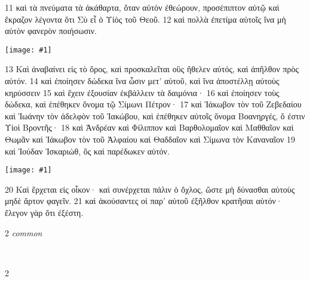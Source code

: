 \documentclass[10pt,a5paper,twoside,twocolumn]{book}
\newcommand{\fig}[1]{\texttt{[image: \#1]}\label{fig:#1}}
\newcommand*\cleartoleftpage{%
  \ifodd\value{page}\hbox{}\clearpage\fi
}
\newcommand{\separator}{\hspace{0.27\textwidth}\noindent\makebox[\linewidth]{\resizebox{0.3333\linewidth}{1pt}{$\bullet$}}\bigskip}
\newenvironment{facing}{\cleartoleftpage}{\clearpage\pagebreak}
\newenvironment{help}{\clearpage}{}
\newenvironment{helpsec}{\begin{minipage}[t]{\textwidth}\begin{multicols}{2}}{\end{multicols}\end{minipage}}
\newenvironment{vocab}{\begin{helpsec}}{\end{helpsec}}
\newenvironment{translation}{\separator\\\begin{helpsec}\footnotesize}{\end{helpsec}}
\begin{document}
\begin{facing}

11 καὶ τὰ πνεύματα τὰ ἀκάθαρτα, ὅταν αὐτὸν ἐθεώρουν, προσέπιπτον αὐτῷ καὶ ἔκραζον λέγοντα ὅτι Σὺ εἶ ὁ Υἱὸς τοῦ Θεοῦ. 12 καὶ πολλὰ ἐπετίμα αὐτοῖς ἵνα μὴ αὐτὸν φανερὸν ποιήσωσιν. 

\fig{03-13} %

13 Καὶ ἀναβαίνει εἰς τὸ ὄρος, καὶ προσκαλεῖται οὓς ἤθελεν αὐτός, καὶ ἀπῆλθον πρὸς αὐτόν. 14 καὶ ἐποίησεν δώδεκα ἵνα ὦσιν μετ’ αὐτοῦ, καὶ ἵνα ἀποστέλλῃ αὐτοὺς κηρύσσειν 15 καὶ ἔχειν ἐξουσίαν ἐκβάλλειν τὰ δαιμόνια· 16 καὶ ἐποίησεν τοὺς δώδεκα, καὶ ἐπέθηκεν ὄνομα τῷ Σίμωνι Πέτρον· 17 καὶ Ἰάκωβον τὸν τοῦ Ζεβεδαίου καὶ Ἰωάνην τὸν ἀδελφὸν τοῦ Ἰακώβου, καὶ ἐπέθηκεν αὐτοῖς ὄνομα Βοανηργές, ὅ ἐστιν Υἱοὶ Βροντῆς· 18 καὶ Ἀνδρέαν καὶ Φίλιππον καὶ Βαρθολομαῖον καὶ Μαθθαῖον καὶ Θωμᾶν καὶ Ἰάκωβον τὸν τοῦ Ἁλφαίου καὶ Θαδδαῖον καὶ Σίμωνα τὸν Καναναῖον 19 καὶ Ἰούδαν Ἰσκαριώθ, ὃς καὶ παρέδωκεν αὐτόν.

\fig{03-20} %

	20 Καὶ ἔρχεται εἰς οἶκον· καὶ συνέρχεται πάλιν ὁ ὄχλος, ὥστε μὴ δύνασθαι αὐτοὺς μηδὲ ἄρτον φαγεῖν. 21 καὶ ἀκούσαντες οἱ παρ’ αὐτοῦ ἐξῆλθον κρατῆσαι αὐτόν· ἔλεγον γὰρ ὅτι ἐξέστη. 

\begin{help}
\begin{vocab}
\emph{common}\\

\end{vocab}
\begin{translation}

\end{translation}
\end{help}
\end{facing}

\end{document}
